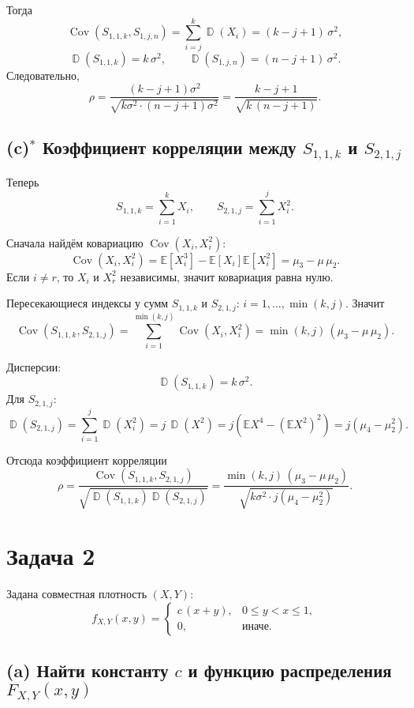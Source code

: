 \documentclass[12pt]{article}
\DeclareMathOperator{\Var}{\mathbb{D}}
\DeclareMathOperator{\Cov}{Cov}
\newcommand{\E}{\mathbb{E}}
\begin{document}
    Тогда
    \[
        \Cov(S_{1,1,k}, S_{1,j,n})
        = \sum_{i=j}^{k} \Var(X_i)
        = (k-j+1)\,\sigma^2,
    \]
    \[
        \Var(S_{1,1,k}) = k\,\sigma^2,\qquad
        \Var(S_{1,j,n}) = (n-j+1)\,\sigma^2.
    \]
    Следовательно,
    \[
        \rho
        = \frac{(k-j+1)\sigma^2}{\sqrt{k\sigma^2 \cdot (n-j+1)\sigma^2}}
        = \frac{k-j+1}{\sqrt{k\,(n-j+1)}}.
    \]

    \subsection*{(c)$^\ast$ Коэффициент корреляции между $S_{1,1,k}$ и $S_{2,1,j}$}

    Теперь
    \[
        S_{1,1,k} = \sum_{i=1}^k X_i,\qquad
        S_{2,1,j} = \sum_{i=1}^j X_i^2.
    \]

    Сначала найдём ковариацию $\Cov(X_i, X_i^2)$:
    \[
        \Cov(X_i, X_i^2)
        = \E[X_i^3] - \E[X_i]\E[X_i^2]
        = \mu_3 - \mu\,\mu_2.
    \]
    Если $i\neq r$, то $X_i$ и $X_r^2$ независимы, значит ковариация равна нулю.

    Пересекающиеся индексы у сумм $S_{1,1,k}$ и $S_{2,1,j}$: $i=1,\dots,\min(k,j)$. Значит
    \[
        \Cov(S_{1,1,k}, S_{2,1,j})
        = \sum_{i=1}^{\min(k,j)} \Cov(X_i, X_i^2)
        = \min(k,j)\,(\mu_3 - \mu\,\mu_2).
    \]

    Дисперсии:
    \[
        \Var(S_{1,1,k}) = k\,\sigma^2.
    \]
    Для $S_{2,1,j}$:
    \[
        \Var(S_{2,1,j})
        = \sum_{i=1}^j \Var(X_i^2)
        = j \,\Var(X^2)
        = j\left( \E X^4 - (\E X^2)^2 \right)
        = j(\mu_4 - \mu_2^2).
    \]

    Отсюда коэффициент корреляции
    \[
        \rho
        = \frac{\Cov(S_{1,1,k}, S_{2,1,j})}{\sqrt{\Var(S_{1,1,k})\Var(S_{2,1,j})}}
        = \frac{ \min(k,j)\,(\mu_3 - \mu\,\mu_2)}
        {\sqrt{ k\sigma^2 \cdot j(\mu_4 - \mu_2^2) }}.
    \]


    \section*{Задача 2}

    Задана совместная плотность $(X,Y)$:
    \[
        f_{X,Y}(x,y)=
        \begin{cases}
            c\,(x+y), & 0 \le y < x \le 1,\\
            0, & \text{иначе.}
        \end{cases}
    \]

    \subsection*{(a) Найти константу $c$ и функцию распределения $F_{X,Y}(x,y)$}
\end{document}
